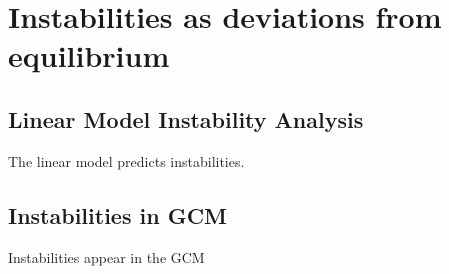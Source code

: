 %
%
%
%
%
%
%



\section{Instabilities as deviations from equilibrium}

\subsection*{Linear Model Instability Analysis}

The linear model predicts instabilities.

\subsection*{Instabilities in GCM}

Instabilities appear in the GCM












% 
% 
